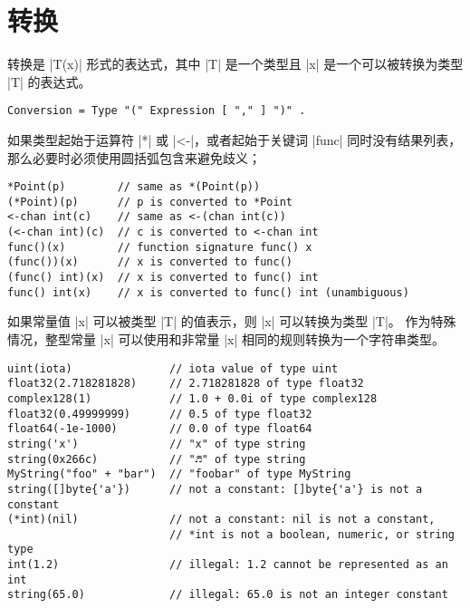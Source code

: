 \section{转换}
转换是 \code|T(x)| 形式的表达式，其中 \code|T| 是一个类型且 \code|x| 是一个可以被转换为类型 \code|T| 的表达式。
\begin{lstlisting}[style=EBNF]
Conversion = Type "(" Expression [ "," ] ")" .
\end{lstlisting}
如果类型起始于运算符 \code|*| 或 \code|<-|，或者起始于关键词 \code|func| 同时没有结果列表，那么必要时必须使用圆括弧包含来避免歧义；
\begin{lstlisting}[style=golang]
*Point(p)        // same as *(Point(p))
(*Point)(p)      // p is converted to *Point
<-chan int(c)    // same as <-(chan int(c))
(<-chan int)(c)  // c is converted to <-chan int
func()(x)        // function signature func() x
(func())(x)      // x is converted to func()
(func() int)(x)  // x is converted to func() int
func() int(x)    // x is converted to func() int (unambiguous)
\end{lstlisting}
如果常量值 \code|x| 可以被类型 \code|T| 的值表示，则 \code|x| 可以转换为类型 \code|T|。
作为特殊情况，整型常量 \code|x| 可以使用和非常量 \code|x| 相同的规则转换为一个字符串类型。
\begin{lstlisting}[style=golang]
uint(iota)               // iota value of type uint
float32(2.718281828)     // 2.718281828 of type float32
complex128(1)            // 1.0 + 0.0i of type complex128
float32(0.49999999)      // 0.5 of type float32
float64(-1e-1000)        // 0.0 of type float64
string('x')              // "x" of type string
string(0x266c)           // "♬" of type string
MyString("foo" + "bar")  // "foobar" of type MyString
string([]byte{'a'})      // not a constant: []byte{'a'} is not a constant
(*int)(nil)              // not a constant: nil is not a constant, 
						 // *int is not a boolean, numeric, or string type
int(1.2)                 // illegal: 1.2 cannot be represented as an int
string(65.0)             // illegal: 65.0 is not an integer constant
\end{lstlisting}

